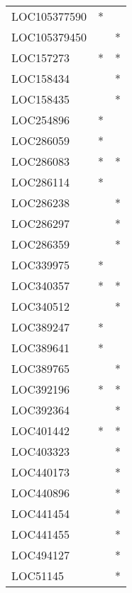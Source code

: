 \begin{longtable}{lcc}
LOC105377590          &              * &            \\
LOC105379450          &                &          * \\
LOC157273             &              * &          * \\
LOC158434             &                &          * \\
LOC158435             &                &          * \\
LOC254896             &              * &            \\
LOC286059             &              * &            \\
LOC286083             &              * &          * \\
LOC286114             &              * &            \\
LOC286238             &                &          * \\
LOC286297             &                &          * \\
LOC286359             &                &          * \\
LOC339975             &              * &            \\
LOC340357             &              * &          * \\
LOC340512             &                &          * \\
LOC389247             &              * &            \\
LOC389641             &              * &            \\
LOC389765             &                &          * \\
LOC392196             &              * &          * \\
LOC392364             &                &          * \\
LOC401442             &              * &          * \\
LOC403323             &                &          * \\
LOC440173             &                &          * \\
LOC440896             &                &          * \\
LOC441454             &                &          * \\
LOC441455             &                &          * \\
LOC494127             &                &          * \\
LOC51145              &                &          * \\

\end{longtable}
